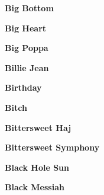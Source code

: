 \vspace{10pt} 
\begin{center}\textbf{Big Bottom}\end{center}
\newline
\vspace{10pt} 
\begin{center}\textbf{Big Heart}\end{center}
\newline
\vspace{10pt} 
\begin{center}\textbf{Big Poppa}\end{center}
\newline
\vspace{10pt} 
\begin{center}\textbf{Billie Jean}\end{center}
\newline
\vspace{10pt} 
\begin{center}\textbf{Birthday}\end{center}
\newline
\vspace{10pt} 
\begin{center}\textbf{Bitch}\end{center}
\newline
\vspace{10pt} 
\begin{center}\textbf{Bittersweet Haj}\end{center}
\newline
\vspace{10pt} 
\begin{center}\textbf{Bittersweet Symphony}\end{center}
\newline
\vspace{10pt} 
\begin{center}\textbf{Black Hole Sun}\end{center}
\newline
\vspace{10pt} 
\begin{center}\textbf{Black Messiah}\end{center}
